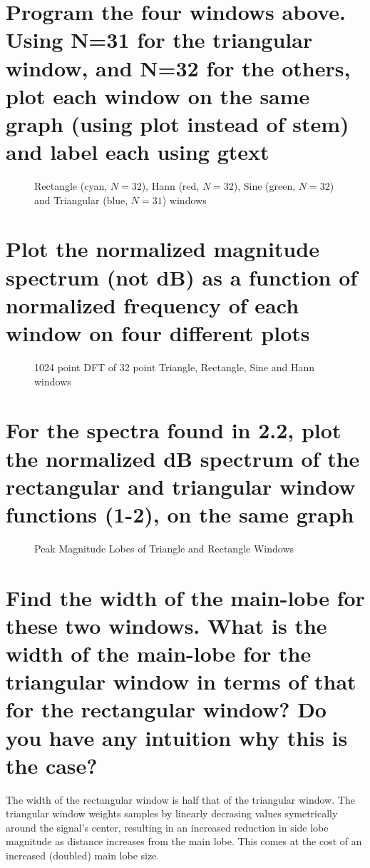\documentclass[titlepage]{scrartcl}
\begin{document}
\section{Program the four windows above. Using N=31 for the triangular
window, and N=32 for the others, plot each window on the same graph (using plot
instead of stem) and label each using gtext}

\begin{figure}[H]
    \caption{Rectangle (cyan, $N=32$), Hann (red, $N=32$), Sine (green, $N=32$) and Triangular (blue, $N=31$)
    windows }
    \label{windows}
\end{figure}

\section{Plot the normalized magnitude spectrum (not dB) as a function of
normalized frequency of each window on four different plots}
\begin{figure}[H]
    \caption{1024 point DFT of 32 point Triangle, Rectangle, Sine and Hann
    windows}
    \label{4WinFFT}
\end{figure}

\section{For the spectra found in 2.2, plot the normalized dB spectrum of the
rectangular and triangular window functions (1-2), on the same graph}
\begin{figure}[H]
    \caption{Peak Magnitude Lobes of Triangle and Rectangle Windows}
    \label{TriRectDFT}
\end{figure}

\section{Find the width of the main-lobe for these two windows. What is the
width of the main-lobe for the triangular window in terms of that for the
rectangular window? Do you have any intuition why this is the case?} The width
of the rectangular window is half that of the triangular window. The triangular
window weights samples by linearly decrasing values symetrically around the
signal's center, resulting in an increased reduction in side lobe magnitude as
distance increases from the main lobe. This comes at the cost of an increased
(doubled) main lobe size. 
\end{document}
